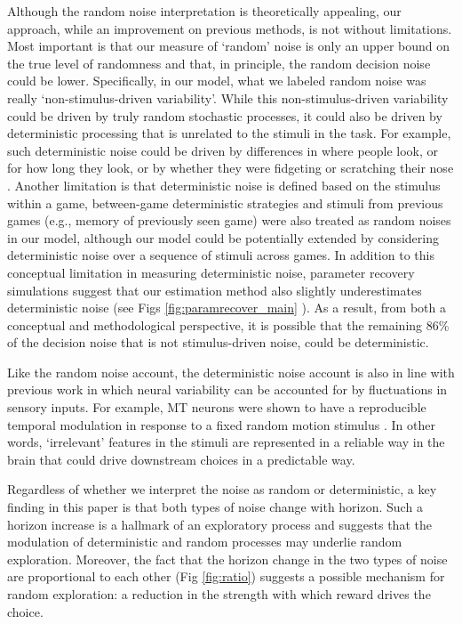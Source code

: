 \documentclass[12pt]{article}
\begin{document}
{Although the random noise interpretation is theoretically appealing, our approach, while an improvement on previous methods, is not without limitations. Most important is that our measure of `random' noise is only an upper bound on the true level of randomness and that, in principle, the random decision noise could be lower. Specifically, in our model, what we labeled random noise was really `non-stimulus-driven variability'. While this non-stimulus-driven variability could be driven by truly random stochastic processes, it could also be driven by deterministic processing that is unrelated to the stimuli in the task. For example, such deterministic noise could be driven by differences in where people look, or for how long they look, or by whether they were fidgeting or scratching their nose \citep{Musall2019}. Another limitation is that deterministic noise is defined based on the stimulus within a game, between-game deterministic strategies and stimuli from previous games (e.g., memory of previously seen game) were also treated as random noises in our model, although our model could be potentially extended by considering deterministic noise over a sequence of stimuli across games. In addition to this conceptual limitation in measuring deterministic noise, parameter recovery simulations suggest that our estimation method also slightly underestimates deterministic noise (see Figs \ref{fig:paramrecover_main} ). As a result, from both a conceptual and methodological perspective, it is possible that the remaining 86\% of the decision noise that is not stimulus-driven noise, could be deterministic.

Like the random noise account, the deterministic noise account is also in line with previous work in which neural variability can be accounted for by fluctuations in sensory inputs. For example, MT neurons were shown to have a reproducible temporal modulation in response to a fixed random motion stimulus \citep{Bair1996}. In other words, `irrelevant' features in the stimuli are represented in a reliable way in the brain that could drive downstream choices in a predictable way. 

Regardless of whether we interpret the noise as random or deterministic, a key finding in this paper is that both types of noise change with horizon. Such a horizon increase is a hallmark of an exploratory process and suggests that the modulation of deterministic and random processes may underlie random exploration. Moreover, the fact that the horizon change in the two types of noise are proportional to each other (Fig \ref{fig:ratio}) suggests a possible mechanism for random exploration: a reduction in the strength with which reward drives the choice. 

}
\end{document}
